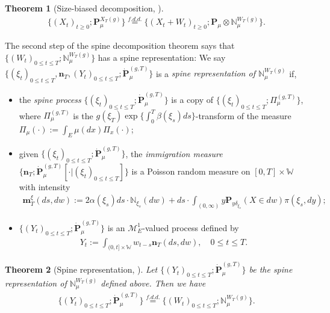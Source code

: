 \documentclass[UTF8]{pkuthss}
\theoremstyle{plain}
\newtheorem{thm}{Theorem}[section]
\theoremstyle{definition}
\numberwithin{equation}{section}
\begin{document}
\begin{thm}[Size-biased decomposition,  \cite{RenSongSun2019Spine}]\label{thm: size-biased decomposition}
\begin{align}
	\{(X_t)_{t\geq 0}; \mathbf P_\mu^{X_T(g)}\}
	\overset{f.d.d.}{=} \{(X_t+W_t)_{t\geq 0}; \mathbf P_\mu  \otimes \mathbb N^{W_T(g)}_\mu\}.
\end{align}
\end{thm}
	The second step of the spine decomposition theorem
	says that $\{(W_t)_{0\leq t\leq T}; \mathbb N^{W_T(g)}_\mu\}$ has a spine representation:
	We say $\{(\xi_t)_{0\leq t\leq T}, \mathbf n_T,  (Y_t)_{ 0\leq t\leq T}; \dot {\mathbf P}^{(g,T)}_\mu\}$ is a \emph{spine representation of $\mathbb N^{W_T(g)}_\mu$}  if,
\begin{itemize}
\item
	the \emph{spine process} $\{(\xi_t)_{0\leq t\leq T}; \dot{\mathbf P}^{(g,T)}_\mu\}$ is a copy of $\{(\xi_t)_{0\leq t\leq T}; \Pi^{(g,T)}_{\mu}\}$, 
	where $\Pi^{(g,T)}_{\mu}$ is the $g(\xi_T) \exp\{\int_0^T \beta(\xi_s)ds\}$-transform
	of the measure $\Pi_{\mu}(\cdot):=\int_{E}\mu(dx)\Pi_x(\cdot) $;
\item
	given $\{(\xi_t)_{0\leq t\leq T}; \dot{\mathbf P}^{(g,T)}_\mu\}$, the \emph{immigration measure} $\{\mathbf n_T; \dot{\mathbf P}^{(g,T)}_\mu[\cdot |(\xi_t)_{0\leq t\leq T}]\}$ is a Poisson random measure on $[0,T] \times \mathbb W$ with intensity
\begin{align}
	\mathbf m^\xi_T(ds,dw)
	:= 2 \alpha(\xi_s) ds \cdot \mathbb N_{\xi_s}(dw) + ds \cdot \int_{(0,\infty)} y \mathbf P_{y\delta_{\xi_s}}(X\in dw) \pi(\xi_s,dy);
\end{align}
\item
	$\{(Y_t)_{0\leq t\leq T}; \dot{\mathbf P}^{(g,T)}_\mu\}$ is an $\mathcal M^1_E$-valued process defined by
\begin{align}
	Y_t
	:= \int_{(0,t] \times \mathbb W} w_{t-s} \mathbf n_T(ds,dw),
	\quad 0 \leq t\leq T.
\end{align}
\end{itemize}

\begin{thm}[Spine representation, \cite{RenSongSun2019Spine}]\label{thm: spine representation}
	Let $\{(Y_t)_{0\leq t\leq T}; \dot {\mathbf P}^{(g,T)}_\mu\}$ be the spine representation of $\mathbb N^{W_T(g)}_\mu$ defined above.
	Then we have
\begin{align}
	\{(Y_t)_{0\leq t\leq T}; \dot{\mathbf P}^{(g,T)}_\mu\}
	\overset{f.d.d.}{=} \{(W_t)_{0\leq t\leq T}; \mathbb N_\mu^{W_T(g)}\}.
\end{align}
\end{thm}
\end{document}
